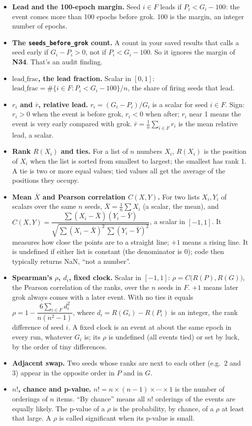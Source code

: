 \documentclass[11pt,a4paper,oneside,openany]{report}
\newcommand{\leadfrac}{\mathrm{lead\_frac}}
\newcommand{\rbar}{\bar{r}}
\newcommand{\code}[1]{\texttt{#1}}
\newcommand{\gl}[1]{\textbf{#1}}   %
\newenvironment{glist}{\begin{itemize}\setlength{\itemsep}{2pt}\setlength{\parskip}{1pt}}{\end{itemize}}
\begin{document}
\begin{glist}
\item[\gl{N34}] \textbf{Lead and the 100-epoch margin.} Seed $i \in F$ leads if $P_i < G_i - 100$: the event comes more than 100 epochs before grok. 100 is the margin, an integer number of epochs.
\item[\gl{N35}] \textbf{The \code{seeds\_\allowbreak{}before\_\allowbreak{}grok} count.} A count in your saved results that calls a seed early if $G_i - P_i > 0$, not if $P_i < G_i - 100$. So it ignores the margin of \gl{N34}. That's an audit finding.
\item[\gl{N36}] \textbf{$\leadfrac$, the lead fraction.} Scalar in $[0, 1]$:
$\leadfrac = \#\{i \in F : P_i < G_i - 100\} / n$, the share of firing seeds that lead.
\item[\gl{N37}] \textbf{$r_i$ and $\rbar$, relative lead.} $r_i = (G_i - P_i)/G_i$ is a scalar for seed $i \in F$. Sign: $r_i > 0$ when the event is before grok, $r_i < 0$ when after; $r_i$ near 1 means the event is very early compared with grok. $\rbar = \frac{1}{n} \sum_{i \in F} r_i$ is the mean relative lead, a scalar.
\item[\gl{N38}] \textbf{Rank $R(X_i)$ and ties.} For a list of $n$ numbers $X_i$, $R(X_i)$ is the position of $X_i$ when the list is sorted from smallest to largest; the smallest has rank 1. A tie is two or more equal values; tied values all get the average of the positions they occupy.
\item[\gl{N39}] \textbf{Mean $\bar X$ and Pearson correlation $C(X, Y)$.} For two lists $X_i, Y_i$ of scalars over the same $n$ seeds, $\bar X = \frac{1}{n}\sum X_i$ (a scalar, the mean), and
$C(X, Y) = \dfrac{\sum (X_i - \bar X)(Y_i - \bar Y)}{\sqrt{\sum (X_i - \bar X)^2 \, \sum (Y_i - \bar Y)^2}}$,
a scalar in $[-1, 1]$. It measures how close the points are to a straight line; $+1$ means a rising line. It is undefined if either list is constant (the denominator is 0); code then typically returns NaN, ``not a number''.
\item[\gl{N40}] \textbf{Spearman's $\rho$, $d_i$, fixed clock.} Scalar in $[-1, 1]$: $\rho = C\big(R(P), R(G)\big)$, the Pearson correlation of the ranks, over the $n$ seeds in $F$. $+1$ means later grok always comes with a later event. With no ties it equals $\rho = 1 - \dfrac{6 \sum_{i \in F} d_i^2}{n(n^2 - 1)}$, where $d_i = R(G_i) - R(P_i)$ is an integer, the rank difference of seed $i$. A fixed clock is an event at about the same epoch in every run, whatever $G_i$ is; its $\rho$ is undefined (all events tied) or set by luck, by the order of tiny differences.
\item[\gl{N41}] \textbf{Adjacent swap.} Two seeds whose ranks are next to each other (e.g.\ 2 and 3) appear in the opposite order in $P$ and in $G$.
\item[\gl{N42}] \textbf{$n!$, chance and p-value.} $n! = n \times (n-1) \times \cdots \times 1$ is the number of orderings of $n$ items. ``By chance'' means all $n!$ orderings of the events are equally likely. The p-value of a $\rho$ is the probability, by chance, of a $\rho$ at least that large. A $\rho$ is called significant when its p-value is small.
\end{glist}
\end{document}

